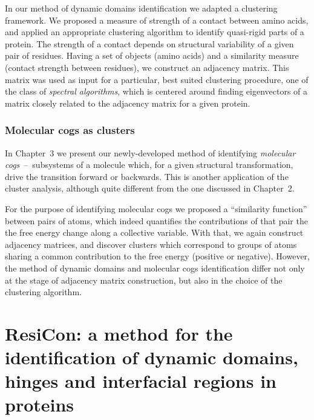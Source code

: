\documentclass[a4paper,11pt,twoside]{book}%
\begin{document}
In our method of dynamic domains identification we adapted a clustering framework.
We proposed a measure of strength of a contact between amino acids, and applied an appropriate clustering algorithm to identify quasi-rigid parts of a protein.
The strength of a contact depends on structural variability of a given pair of residues.
Having a set of objects (amino acids) and a similarity measure (contact strength between residues), we construct an adjacency matrix.
This matrix was used as input for a particular, best suited clustering procedure, one of the class of \emph{spectral algorithms}, which is centered around finding eigenvectors of a matrix closely related to the adjacency matrix for a given protein.

\subsection{Molecular cogs as clusters}

In Chapter~3 we present our newly-developed method of identifying \emph{molecular cogs}~--~subsystems of a molecule which, for a given structural transformation, drive the transition forward or backwards.
This is another application of the cluster analysis, although quite different from the one discussed in Chapter~2.

For the purpose of identifying molecular cogs we proposed a ``similarity function'' between pairs of atoms, which indeed quantifies the contributions of that pair the the free energy change along a collective variable.
With that, we again construct adjacency matrices, and discover clusters which correspond to groups of atoms sharing a common contribution to the free energy (positive or negative).
However, the method of dynamic domains and molecular cogs identification differ not only at the stage of adjacency matrix construction, but also in the choice of the clustering algorithm.





\newcommand{\angstrom}{\mbox{\normalfont\AA}}
\newcommand{\myHeight}{0.13}
\renewcommand{\arraystretch}{1.9} %

\chapter{ResiCon: a method for the identification of dynamic domains, hinges and interfacial regions in proteins}
\end{document}

